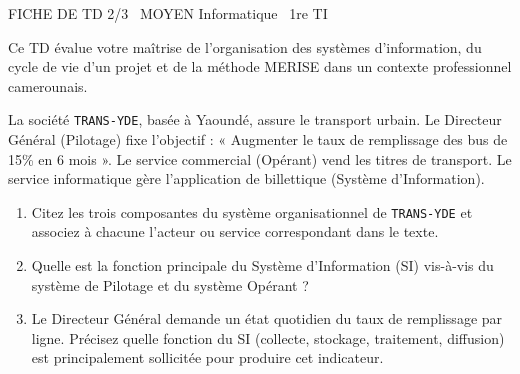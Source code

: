 \documentclass[11pt]{article}
\begin{document}
\begin{tcolorbox}[enhanced,colback=popink,colframe=popink,arc=10pt,boxrule=0pt,left=12pt,right=12pt,top=9pt,bottom=9pt]
{\color{white}\popxbold\small FICHE DE TD 2/3 \textbullet\ MOYEN \hfill Informatique \textbullet\ 1re TI\par}
\end{tcolorbox}
\vspace{4pt}
Ce TD évalue votre maîtrise de l'organisation des systèmes d'information, du cycle de vie d'un projet et de la méthode MERISE dans un contexte professionnel camerounais.

\begin{exercice}
La société \texttt{TRANS-YDE}, basée à Yaoundé, assure le transport urbain. Le Directeur Général (Pilotage) fixe l'objectif : « Augmenter le taux de remplissage des bus de 15\% en 6 mois ». Le service commercial (Opérant) vend les titres de transport. Le service informatique gère l'application de billettique (Système d'Information).
\begin{enumerate}
    \item Citez les trois composantes du système organisationnel de \texttt{TRANS-YDE} et associez à chacune l'acteur ou service correspondant dans le texte.
    \item Quelle est la fonction principale du Système d'Information (SI) vis-à-vis du système de Pilotage et du système Opérant ?
    \item Le Directeur Général demande un état quotidien du taux de remplissage par ligne. Précisez quelle fonction du SI (collecte, stockage, traitement, diffusion) est principalement sollicitée pour produire cet indicateur.
\end{enumerate}
\end{exercice}
\end{document}
